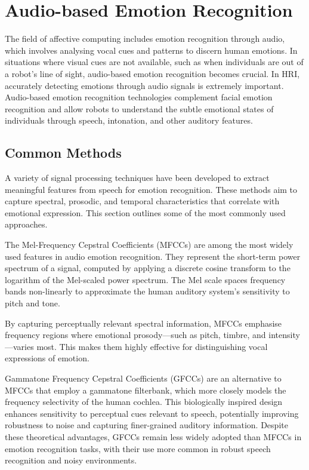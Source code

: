 \section{Audio-based Emotion Recognition}

The field of affective computing includes emotion recognition through audio, which involves analysing vocal cues and patterns to discern human emotions. In situations where visual cues are not available, such as when individuals are out of a robot's line of sight, audio-based emotion recognition becomes crucial. In HRI, accurately detecting emotions through audio signals is extremely important. Audio-based emotion recognition technologies complement facial emotion recognition and allow robots to understand the subtle emotional states of individuals through speech, intonation, and other auditory features.

\subsection{Common Methods}
A variety of signal processing techniques have been developed to extract meaningful features from speech for emotion recognition. These methods aim to capture spectral, prosodic, and temporal characteristics that correlate with emotional expression. This section outlines some of the most commonly used approaches.

The Mel-Frequency Cepstral Coefficients (MFCCs) \cite{Ali2021-ie} are among the most widely used features in audio emotion recognition. They represent the short-term power spectrum of a signal, computed by applying a discrete cosine transform to the logarithm of the Mel-scaled power spectrum. The Mel scale spaces frequency bands non-linearly to approximate the human auditory system's sensitivity to pitch and tone.

By capturing perceptually relevant spectral information, MFCCs emphasise frequency regions where emotional prosody—such as pitch, timbre, and intensity—varies most. This makes them highly effective for distinguishing vocal expressions of emotion.

Gammatone Frequency Cepstral Coefficients (GFCCs) \cite{Shi2016-th} are an alternative to MFCCs that employ a gammatone filterbank, which more closely models the frequency selectivity of the human cochlea. This biologically inspired design enhances sensitivity to perceptual cues relevant to speech, potentially improving robustness to noise and capturing finer-grained auditory information. Despite these theoretical advantages, GFCCs remain less widely adopted than MFCCs in emotion recognition tasks, with their use more common in robust speech recognition and noisy environments.


